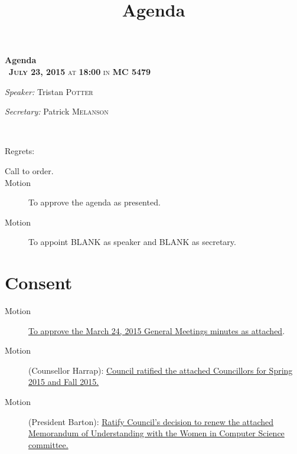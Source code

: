\documentclass[12pt, letterpaper]{article}
\title{Agenda}
\newcommand{\meetingDate}{July 23, 2015}
\newcommand{\meetingTime}{18:00}
\newcommand{\meetingLocation}{MC 5479}
\begin{document}
\hypersetup{} %


\begin{center}
{ \huge \bfseries Agenda \\[0.4cm] }
{\textsc{~\textbf{\meetingDate} at \textbf{\meetingTime} in \textbf{\meetingLocation}}}
\\[0.2cm]

\begin{minipage}[t]{0.5\textwidth}
\begin{flushleft} \large
\emph{Speaker:}
Tristan \textsc{Potter}
\end{flushleft}
\end{minipage}%
\begin{minipage}[t]{0.5\textwidth}
\begin{flushright} \large
\emph{Secretary:} 
Patrick \textsc{Melanson}
\end{flushright}
\end{minipage}

\HRule \\[0.4cm]
\end{center}
Regrets: 
\begin{description}
	\item[Call to order.]
	\item[Motion] To approve the agenda as presented.
	\item[Motion] To appoint BLANK as speaker and BLANK as secretary.
\end{description}
\section*{Consent}
\begin{description}
	\item[Motion] \hyperref[minutes]{To approve the March 24, 2015 General Meetings minutes as attached}.
	\item[Motion] (Counsellor Harrap): \hyperref[noms]{Council ratified the attached Councillors for Spring 2015 and Fall 2015.}
	\item[Motion] (President Barton): \hyperref[wics]{Ratify Council's decision to renew the attached Memorandum of Understanding with the Women in Computer Science committee.}
\end{description}
\HRule
\end{document}
